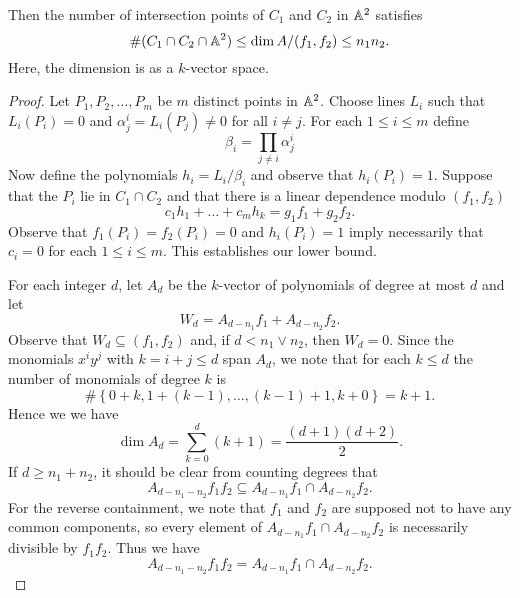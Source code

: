 \documentclass[10pt]{amsart}
\begin{document}
\begin{prop}\label{prop1}
  Then the number of intersection points of $C_1$ and $C_2$ in $\mathbb{A}^2$ satisfies
  $$\#(C_1 \cap C_2 \cap \mathbb{A}^2) \leq \dim A /(f_1,f_2) \leq n_1n_2.$$
  Here, the dimension is as a $k$-vector space.

  \begin{proof}
    Let $P_1, P_2, \ldots, P_m$ be $m$ distinct points in $\mathbb{A}^2$.
    Choose lines $L_i$ such that $L_i(P_i) = 0$ and $\alpha_j^i = L_i(P_j) \neq 0$ for all $i \neq j$.
    For each $1 \leq i \leq m$ define $$\beta_i = \prod_{j \neq i} \alpha_j^i$$
    Now define the polynomials $h_i = L_i/\beta_i$ and observe that $h_i(P_i) = 1$.
    Suppose that the $P_i$ lie in $C_1 \cap C_2$ and that there is a linear dependence modulo $(f_1, f_2)$
    $$c_1h_1 + \ldots + c_mh_k = g_1f_1 + g_2f_2.$$
    Observe that $f_1(P_i) = f_2(P_i) = 0$ and $h_i(P_i) = 1$ imply necessarily that $c_i = 0$ for each $1 \leq i \leq m$.
    This establishes our lower bound.

    For each integer $d$, let $A_d$ be the $k$-vector of polynomials of degree at most $d$ and let 
    $$W_d = A_{d - n_1}f_1 + A_{d - n_2}f_2.$$
    Observe that $W_d \subseteq (f_1, f_2)$ and, if $d < n_1 \vee n_2$, then $W_d = 0$.
    Since the monomials $x^iy^j$ with $k = i + j \leq d$ span $A_d$, we note that for each $k \leq d$ the number of monomials of degree $k$ is
    $$\#\left\{0 + k, 1 + (k-1), \ldots, (k-1) + 1, k + 0\right\} = k + 1.$$
    Hence we we have
    $$\dim{A_d} = \sum_{k=0}^d (k + 1) = \frac{(d + 1)(d + 2)}{2}.$$
    If $d \geq n_1 + n_2$, it should be clear from counting degrees that 
    $$A_{d - n_1 - n_2}f_1f_2 \subseteq A_{d - n_1}f_1 \cap A_{d - n_2}f_2.$$
    For the reverse containment, we note that $f_1$ and $f_2$ are supposed not to have any common components, so every element of $A_{d - n_1}f_1 \cap A_{d - n_2}f_2$ is necessarily divisible by $f_1f_2$.
    Thus we have 
    \begin{equation}\label{eq1.1}
      A_{d - n_1 - n_2}f_1f_2 = A_{d - n_1}f_1 \cap A_{d - n_2}f_2.
    \end{equation}


\end{proof}
\end{prop}
\end{document}
